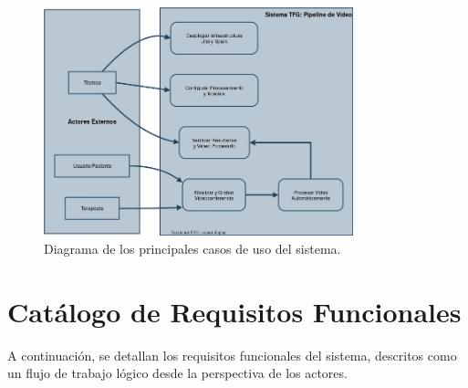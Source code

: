 \begin{figure}[H]
    \centering
    \includegraphics[width=0.8\textwidth]{img/Diagramacasodeuso.jpg}
    \caption{Diagrama de los principales casos de uso del sistema.}
    \label{fig:anexob_actores}
\end{figure}

\section{Catálogo de Requisitos Funcionales}
\label{sec:requisitos_funcionales}
A continuación, se detallan los requisitos funcionales del sistema, descritos como un flujo de trabajo lógico desde la perspectiva de los actores.

